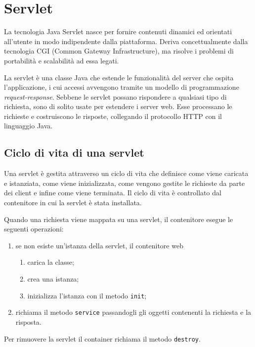 \section{Servlet}
La tecnologia Java Servlet nasce per fornire contenuti dinamici ed orientati all'utente in modo indipendente dalla piattaforma. Deriva concettualmente dalla tecnologia CGI (Common Gateway Infrastructure), ma risolve i problemi di portabilità e scalabilità ad essa legati.

La servlet è una classe Java che estende le funzionalità del server che ospita l'applicazione, i cui accessi avvengono tramite un modello di programmazione \textit{request-response}. Sebbene le servlet possano rispondere a qualsiasi tipo di richiesta, sono di solito usate per estendere i server web. Esse processano le richieste e costruiscono le risposte, collegando il protocollo HTTP con il linguaggio Java.

\subsection{Ciclo di vita di una servlet}
Una servlet è gestita attraverso un ciclo di vita che definisce come viene caricata e istanziata, come viene inizializzata, come vengono gestite le richieste da parte dei client e infine come viene terminata. Il ciclo di vita è controllato dal contenitore in cui la servlet è stata installata.

Quando una richiesta viene mappata su una servlet, il contenitore esegue le seguenti operazioni:
\begin{enumerate}
	\item se non esiste un'istanza della servlet, il contenitore web
	\begin{enumerate}
		\item carica la classe;
		\item crea una istanza;
		\item inizializza l'istanza con il metodo \texttt{init};
	\end{enumerate}
	\item richiama il metodo \texttt{service} passandogli gli oggetti contenenti la richiesta e la risposta.
\end{enumerate}
Per rimuovere la servlet il container richiama il metodo \texttt{destroy}.